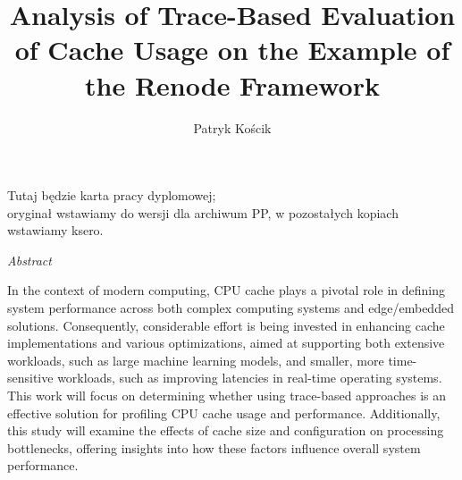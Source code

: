 \documentclass[english,masters,a4paper,oneside]{ppfcmthesis}
\author
{%
   Patryk Kościk \album{144635}
}
\title
{%
   Analysis of Trace-Based Evaluation of Cache Usage on the Example of the Renode Framework
}
\begin{document}
\maketitle\cleardoublepage%


\thispagestyle{empty}\vspace*{\fill}%
\begin{center}Tutaj będzie karta pracy dyplomowej;\\oryginał wstawiamy do wersji dla archiwum PP, w pozostałych kopiach wstawiamy ksero.\end{center}%
\vfill\cleardoublepage%



\begin{vplace}

\begin{center}
   \huge{\textit{Abstract}}
\end{center}

In the context of modern computing, CPU cache plays a pivotal role in defining
system performance across both complex computing systems and edge/embedded solutions.
%
Consequently, considerable effort is being invested in enhancing cache
implementations and various optimizations, aimed at supporting both
extensive workloads, such as large machine learning models, and smaller, more
time-sensitive workloads, such as improving latencies in real-time operating
systems.
%
This work will focus on determining whether using trace-based approaches is an
effective solution for profiling CPU cache usage and performance.
%
Additionally, this study will examine the effects of cache size and configuration
on processing bottlenecks, offering insights into how these factors influence
overall system performance.

\end{vplace}

\newpage
\end{document}
